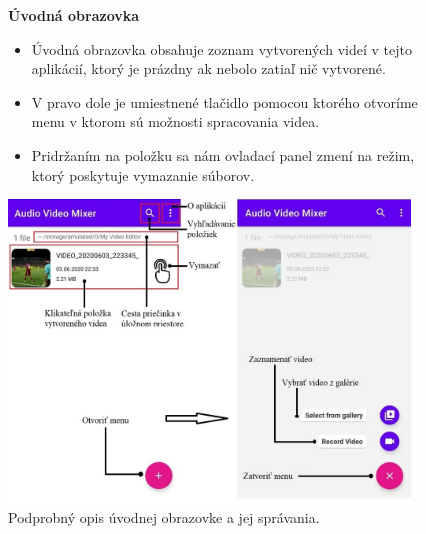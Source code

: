\documentclass[12pt, oneside]{book}
\begin{document}
\begin{figure}[H]

    \hspace{15pt} \textbf{Úvodná obrazovka}

    \begin{itemize}
        \item Úvodná obrazovka obsahuje zoznam vytvorených videí v tejto aplikácií, ktorý je prázdny ak nebolo zatiaľ nič vytvorené. 
        \item V pravo dole je umiestnené tlačidlo pomocou ktorého otvoríme menu v ktorom sú možnosti spracovania videa.
        \item Pridržaním na položku sa nám ovladací panel zmení na režim, ktorý poskytuje vymazanie súborov.
    \end{itemize}

   
  
\vspace{15pt}


\hspace{0.5cm}
  \includegraphics[width=0.95\textwidth]{images/uvodna0.jpg}
    \caption{Podprobný opis úvodnej obrazovke a jej správania.}
    \label{fig:obr10}
    
\end{figure}
\end{document}
